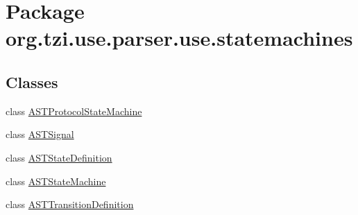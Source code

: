 \hypertarget{namespaceorg_1_1tzi_1_1use_1_1parser_1_1use_1_1statemachines}{\section{Package org.\-tzi.\-use.\-parser.\-use.\-statemachines}
\label{namespaceorg_1_1tzi_1_1use_1_1parser_1_1use_1_1statemachines}
}
\subsection*{Classes}
\begin{DoxyCompactItemize}
\item 
class \hyperlink{classorg_1_1tzi_1_1use_1_1parser_1_1use_1_1statemachines_1_1_a_s_t_protocol_state_machine}{A\-S\-T\-Protocol\-State\-Machine}
\item 
class \hyperlink{classorg_1_1tzi_1_1use_1_1parser_1_1use_1_1statemachines_1_1_a_s_t_signal}{A\-S\-T\-Signal}
\item 
class \hyperlink{classorg_1_1tzi_1_1use_1_1parser_1_1use_1_1statemachines_1_1_a_s_t_state_definition}{A\-S\-T\-State\-Definition}
\item 
class \hyperlink{classorg_1_1tzi_1_1use_1_1parser_1_1use_1_1statemachines_1_1_a_s_t_state_machine}{A\-S\-T\-State\-Machine}
\item 
class \hyperlink{classorg_1_1tzi_1_1use_1_1parser_1_1use_1_1statemachines_1_1_a_s_t_transition_definition}{A\-S\-T\-Transition\-Definition}
\end{DoxyCompactItemize}
